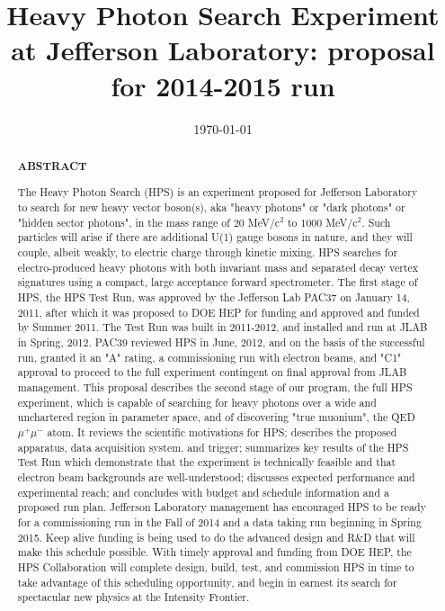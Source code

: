 \documentclass[prc,12pt,nofootinbib]{revtex4}
\begin{document}

\title{\bf\large{Heavy Photon Search Experiment at Jefferson Laboratory: proposal for 2014-2015 run}}


\date{\today}

\begin{abstract}
\clearpage
\begin{centerline}
{\bf {\large ABSTRACT}}
\vspace{0.5cm}
\end{centerline}
\begin{singlespace}

The Heavy Photon Search (HPS) is an experiment proposed for Jefferson Laboratory to search for new heavy vector boson(s), aka "heavy photons" or "dark photons" or "hidden sector photons", in the mass range of $20$ MeV/c$^2$ to $1000$ MeV/c$^2$. Such particles will arise if there are additional U(1) gauge bosons in nature, and they will couple, albeit weakly, to electric charge through kinetic mixing. HPS searches for  electro-produced heavy photons with both invariant mass and separated decay vertex signatures using a compact, large acceptance forward spectrometer. The first stage of HPS, the HPS Test Run, was approved by the Jefferson Lab PAC37 on January 14, 2011, after which it was proposed to DOE HEP for funding and approved and funded by Summer 2011. The Test Run was built in 2011-2012, and installed and run at JLAB in Spring, 2012.  PAC39 reviewed HPS in June, 2012, and on the basis of the successful run, granted it an "A" rating, a commissioning run with electron beams, and "C1" approval to proceed to the full experiment contingent on final approval from JLAB management. This proposal describes the second stage of our program, the full HPS experiment, which is capable of searching for heavy photons over a wide and unchartered region in parameter space, and  of discovering "true muonium", the QED $\mu^+\mu^-$ atom. It reviews the scientific motivations for HPS; describes the proposed apparatus, data acquisition system, and trigger; summarizes key results of the HPS Test Run which demonstrate that the experiment is technically feasible and that electron beam backgrounds are well-understood; discusses expected performance and experimental reach; and concludes with budget and schedule information and a proposed run plan.  Jefferson Laboratory management has encouraged HPS to be ready for a commissioning run in the Fall of 2014 and a data taking run beginning in Spring 2015. Keep alive funding is being used to do the advanced design and R\&D that will make this schedule possible.  With timely approval and funding from DOE HEP,  the HPS Collaboration will complete design, build, test, and commission HPS in time to take advantage of this scheduling opportunity, and begin in earnest its search for spectacular new physics at the Intensity Frontier.
   
\end{singlespace}
\end{abstract}
\end{document}
